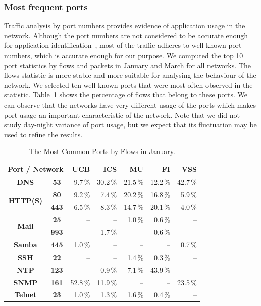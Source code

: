 \subsubsection{Most frequent ports}
Traffic analysis by port numbers provides evidence of application usage in the network. Although the port numbers are not considered to be accurate enough for application identification~\cite{Moore-2005-Toward}, most of the traffic adheres to well-known port numbers, which is accurate enough for our purpose. We computed the top 10 port statistics by flows and packets in January and March for all networks. The flows statistic is more stable and more suitable for analysing the behaviour of the network. We selected ten well-known ports that were most often observed in the statistic. Table~\ref{tab:characterization-ports} shows the percentage of flows that belong to these ports. We can observe that the networks have very different usage of the ports which makes port usage an important characteristic of the network. Note that we did not study day-night variance of port usage, but we expect that its fluctuation may be used to refine the results.

\begin{table}[!t]
        \centering
        \renewcommand{\arraystretch}{1.1}
        \begin{tabular}{|c|c|r|r|r|r|r|} \hline
                \multicolumn{2}{|c|}{\textbf{Port / Network}} & \textbf{UCB} & \textbf{ICS} & \textbf{MU} & \textbf{FI} & \textbf{VSS} \\ \hline
                \textbf{DNS} & \textbf{53} & 9.7\,\% & 30.2\,\% & 21.5\,\% & 12.2\,\% & 42.7\,\% \\ \hline
                \multirow{2}{*}{\textbf{HTTP(S)}} & \textbf{80} & 9.2\,\% & 7.4\,\% & 20.2\,\% & 16.8\,\% & 5.9\,\% \\ \cline{2-7}
                & \textbf{443} & 6.5\,\% & 8.3\,\% & 14.7\,\% & 20.1\,\% & 4.0\,\% \\ \hline
                \multirow{2}{*}{\textbf{Mail}} & \textbf{25} & -- & -- & 1.0\,\% & 0.6\,\% & -- \\  \cline{2-7}
                & \textbf{993} & -- & 1.7\,\% & -- & 0.6\,\% & -- \\ \cline{1-7}
                \textbf{Samba} & \textbf{445} & 1.0\,\% & -- & -- & -- & 0.7\,\%  \\ \hline
                \textbf{SSH} & \textbf{22} & -- & -- & 1.4\,\% & 0.3\,\% & -- \\ \hline
                \textbf{NTP} & \textbf{123} & -- & 0.9\,\% & 7.1\,\% & 43.9\,\% & -- \\ \hline
                \textbf{SNMP} & \textbf{161} & 52.8\,\% & 11.9\,\% & -- & -- & 23.5\,\% \\ \hline
                \textbf{Telnet} & \textbf{23} & 1.0\,\% & 1.3\,\% & 1.6\,\% & 0.4\,\% & -- \\ \hline
        \end{tabular}
        \caption{The Most Common Ports by Flows in January.}
        \label{tab:characterization-ports}
\end{table}

